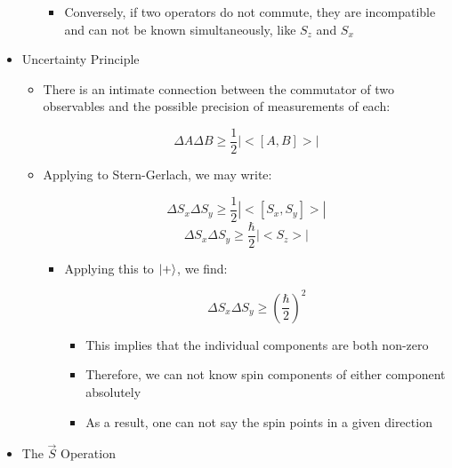 \begin{itemize}
\begin{itemize}
\begin{itemize}
          \item Conversely, if two operators do not commute, they are incompatible and can not be known simultaneously, like $S_z$ and $S_x$

        \end{itemize}

    \end{itemize}

  \item Uncertainty Principle

    \begin{itemize}

      \item There is an intimate connection between the commutator of two observables and the possible precision of measurements of each:

        $$\Delta A\Delta B\geq \frac{1}{2}|<[A,B]>|$$

      \item Applying to Stern-Gerlach, we may write:

        $$\Delta S_x\Delta S_y\geq \frac{1}{2}|<[S_x,S_y]>|$$
        $$\Delta S_x\Delta S_y\geq \frac{\hbar}{2}|<S_z>|$$

        \begin{itemize}

          \item Applying this to $\ket{+}$, we find:

            $$\Delta S_x\Delta S_y\geq \left( \frac{\hbar}{2} \right)^2$$

            \begin{itemize}

              \item This implies that the individual components are both non-zero

              \item Therefore, we can not know spin components of either component absolutely

              \item As a result, one can not say the spin points in a given direction

            \end{itemize}

        \end{itemize}

    \end{itemize}

  \item The $\vec{S}$ Operation


\end{itemize}

